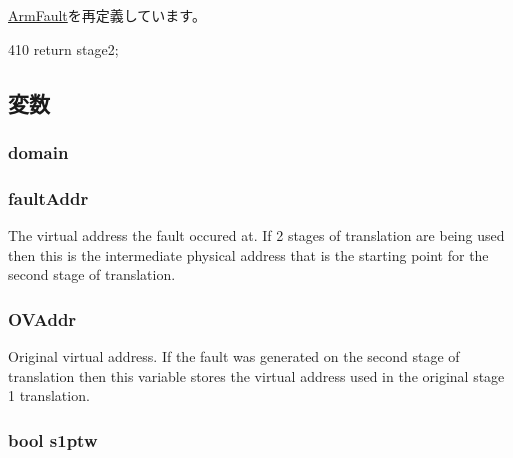 \hyperlink{classArmISA_1_1ArmFault_a61bc59380024a05bdcbb39fb27e0293d}{ArmFault}を再定義しています。


\begin{DoxyCode}
410 { return stage2; }
\end{DoxyCode}


\subsection{変数}
\hypertarget{classArmISA_1_1AbortFault_a8f425ac9ed99f5604dcca4b072c88718}{
\subsubsection[{domain}]{ {\bf domain}}}
\label{classArmISA_1_1AbortFault_a8f425ac9ed99f5604dcca4b072c88718}
\hypertarget{classArmISA_1_1AbortFault_a39e9eff111c8c7d4acfecc9d3bbd29d4}{
\subsubsection[{faultAddr}]{ {\bf faultAddr}}}
\label{classArmISA_1_1AbortFault_a39e9eff111c8c7d4acfecc9d3bbd29d4}
The virtual address the fault occured at. If 2 stages of translation are being used then this is the intermediate physical address that is the starting point for the second stage of translation. \hypertarget{classArmISA_1_1AbortFault_a6d8ab6ddd3da67e07350b2c3ff6c0d80}{
\subsubsection[{OVAddr}]{ {\bf OVAddr}}}
\label{classArmISA_1_1AbortFault_a6d8ab6ddd3da67e07350b2c3ff6c0d80}
Original virtual address. If the fault was generated on the second stage of translation then this variable stores the virtual address used in the original stage 1 translation. \hypertarget{classArmISA_1_1AbortFault_ad135724e922a94add62100a64854ae84}{
\subsubsection[{s1ptw}]{\setlength{\rightskip}{0pt plus 5cm}bool {\bf s1ptw}}}
